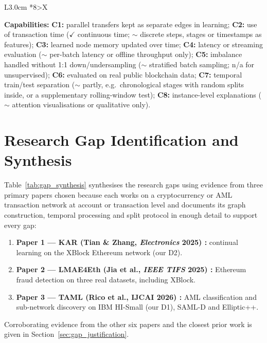 \documentclass[11pt,a4paper]{article}
\begin{document}
\begin{table}[htbp]
\begin{tabularx}{\textwidth}{L{3.0cm} *{8}{>{\centering\arraybackslash}X}}
\bottomrule
\end{tabularx}
\vspace{3pt}
\begin{minipage}{\textwidth}
\scriptsize
\textbf{Capabilities:} \textbf{C1:} parallel transfers kept as separate edges in learning; \textbf{C2:} use of transaction time ($\checkmark$ continuous time; $\sim$ discrete steps, stages or timestamps as features); \textbf{C3:} learned node memory updated over time; \textbf{C4:} latency or streaming evaluation ($\sim$ per-batch latency or offline throughput only); \textbf{C5:} imbalance handled without 1:1 down/undersampling ($\sim$ stratified batch sampling; n/a for unsupervised); \textbf{C6:} evaluated on real public blockchain data; \textbf{C7:} temporal train/test separation ($\sim$ partly, e.g.\ chronological stages with random splits inside, or a supplementary rolling-window test); \textbf{C8:} instance-level explanations ($\sim$ attention visualisations or qualitative only).
\end{minipage}
\end{table}

\section{Research Gap Identification and Synthesis}
\label{sec:research_gaps}

Table~\ref{tab:gap_synthesis} synthesises the research gaps using evidence from three primary papers chosen because each works on a cryptocurrency or AML transaction network at account or transaction level and documents its graph construction, temporal processing and split protocol in enough detail to support every gap:
\begin{enumerate}[leftmargin=*]
    \item \textbf{Paper 1 --- KAR (Tian \& Zhang, \textit{Electronics} 2025) \cite{tian2025kar}:} continual learning on the XBlock Ethereum network (our D2).
    \item \textbf{Paper 2 --- LMAE4Eth (Jia et al., \textit{IEEE TIFS} 2025) \cite{jia2025lmae4eth}:} Ethereum fraud detection on three real datasets, including XBlock.
    \item \textbf{Paper 3 --- TAML (Rico et al., IJCAI 2026) \cite{rico2026taml}:} AML classification and sub-network discovery on IBM HI-Small (our D1), SAML-D and Elliptic++.
\end{enumerate}
Corroborating evidence from the other six papers and the closest prior work is given in Section~\ref{sec:gap_justification}.
\end{document}
